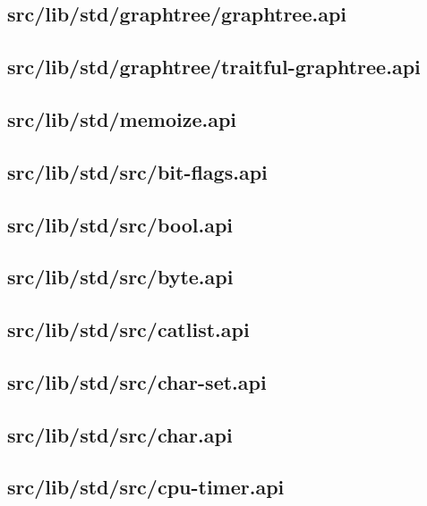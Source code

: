 \subsection{src/lib/std/graphtree/graphtree.api}


\subsection{src/lib/std/graphtree/traitful-graphtree.api}


\subsection{src/lib/std/memoize.api}


\subsection{src/lib/std/src/bit-flags.api}


\subsection{src/lib/std/src/bool.api}


\subsection{src/lib/std/src/byte.api}


\subsection{src/lib/std/src/catlist.api}


\subsection{src/lib/std/src/char-set.api}


\subsection{src/lib/std/src/char.api}


\subsection{src/lib/std/src/cpu-timer.api}



